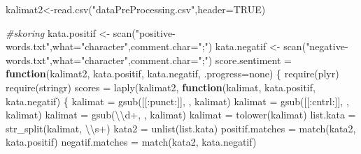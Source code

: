\documentclass[
]{article}
\newenvironment{Shaded}{\begin{snugshade}}{\end{snugshade}}
\newcommand{\AttributeTok}[1]{\textcolor[rgb]{0.77,0.63,0.00}{#1}}
\newcommand{\CommentTok}[1]{\textcolor[rgb]{0.56,0.35,0.01}{\textit{#1}}}
\newcommand{\ConstantTok}[1]{\textcolor[rgb]{0.00,0.00,0.00}{#1}}
\newcommand{\ControlFlowTok}[1]{\textcolor[rgb]{0.13,0.29,0.53}{\textbf{#1}}}
\newcommand{\FunctionTok}[1]{\textcolor[rgb]{0.00,0.00,0.00}{#1}}
\newcommand{\NormalTok}[1]{#1}
\newcommand{\OtherTok}[1]{\textcolor[rgb]{0.56,0.35,0.01}{#1}}
\newcommand{\SpecialCharTok}[1]{\textcolor[rgb]{0.00,0.00,0.00}{#1}}
\newcommand{\StringTok}[1]{\textcolor[rgb]{0.31,0.60,0.02}{#1}}
\begin{document}
\begin{Shaded}
\begin{Highlighting}[]
\NormalTok{kalimat2}\OtherTok{\textless{}{-}}\FunctionTok{read.csv}\NormalTok{(}\StringTok{"dataPreProcessing.csv"}\NormalTok{,}\AttributeTok{header=}\ConstantTok{TRUE}\NormalTok{)}

\CommentTok{\#skoring}
\NormalTok{kata.positif }\OtherTok{\textless{}{-}} \FunctionTok{scan}\NormalTok{(}\StringTok{"positive{-}words.txt"}\NormalTok{,}\AttributeTok{what=}\StringTok{"character"}\NormalTok{,}\AttributeTok{comment.char=}\StringTok{";"}\NormalTok{)}
\NormalTok{kata.negatif }\OtherTok{\textless{}{-}} \FunctionTok{scan}\NormalTok{(}\StringTok{"negative{-}words.txt"}\NormalTok{,}\AttributeTok{what=}\StringTok{"character"}\NormalTok{,}\AttributeTok{comment.char=}\StringTok{";"}\NormalTok{)}
\NormalTok{score.sentiment }\OtherTok{=} \ControlFlowTok{function}\NormalTok{(kalimat2, kata.positif, kata.negatif,}
                           \AttributeTok{.progress=}\StringTok{\textquotesingle{}none\textquotesingle{}}\NormalTok{)}
\NormalTok{\{}
  \FunctionTok{require}\NormalTok{(plyr)}
  \FunctionTok{require}\NormalTok{(stringr)}
\NormalTok{  scores }\OtherTok{=} \FunctionTok{laply}\NormalTok{(kalimat2, }\ControlFlowTok{function}\NormalTok{(kalimat, kata.positif,}
\NormalTok{                                    kata.negatif) \{}
\NormalTok{    kalimat }\OtherTok{=} \FunctionTok{gsub}\NormalTok{(}\StringTok{\textquotesingle{}[[:punct:]]\textquotesingle{}}\NormalTok{, }\StringTok{\textquotesingle{}\textquotesingle{}}\NormalTok{, kalimat)}
\NormalTok{    kalimat }\OtherTok{=} \FunctionTok{gsub}\NormalTok{(}\StringTok{\textquotesingle{}[[:cntrl:]]\textquotesingle{}}\NormalTok{, }\StringTok{\textquotesingle{}\textquotesingle{}}\NormalTok{, kalimat)}
\NormalTok{    kalimat }\OtherTok{=} \FunctionTok{gsub}\NormalTok{(}\StringTok{\textquotesingle{}}\SpecialCharTok{\textbackslash{}\textbackslash{}}\StringTok{d+\textquotesingle{}}\NormalTok{, }\StringTok{\textquotesingle{}\textquotesingle{}}\NormalTok{, kalimat)}
\NormalTok{    kalimat }\OtherTok{=} \FunctionTok{tolower}\NormalTok{(kalimat)}
\NormalTok{    list.kata }\OtherTok{=} \FunctionTok{str\_split}\NormalTok{(kalimat, }\StringTok{\textquotesingle{}}\SpecialCharTok{\textbackslash{}\textbackslash{}}\StringTok{s+\textquotesingle{}}\NormalTok{)}
\NormalTok{    kata2 }\OtherTok{=} \FunctionTok{unlist}\NormalTok{(list.kata)}
\NormalTok{    positif.matches }\OtherTok{=} \FunctionTok{match}\NormalTok{(kata2, kata.positif)}
\NormalTok{    negatif.matches }\OtherTok{=} \FunctionTok{match}\NormalTok{(kata2, kata.negatif)}

\end{Highlighting}
\end{Shaded}
\end{document}
